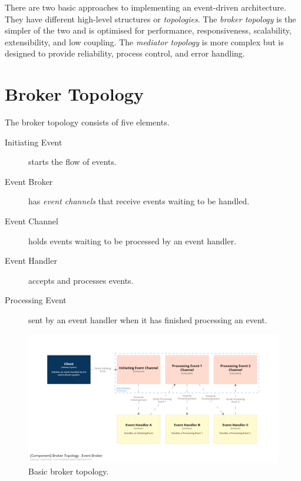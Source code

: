 There are two basic approaches to implementing an event-driven architecture.
They have different high-level structures or \emph{topologies}.
The \emph{broker topology} is the simpler of the two and is optimised for performance, responsiveness, scalability, extensibility, and low coupling.
The \emph{mediator topology} is more complex but is designed to provide reliability, process control, and error handling.


\section{Broker Topology}

The broker topology consists of five elements.

\begin{description}
    \item[Initiating Event] starts the flow of events.
    \item[Event Broker] has \emph{event channels} that receive events waiting to be handled.
    \item[Event Channel] holds events waiting to be processed by an event handler.
    \item[Event Handler] accepts and processes events.
    \item[Processing Event] sent by an event handler when it has finished processing an event.
\end{description}

\begin{figure}[h!]
    \begin{adjustwidth}{-10mm}{-10mm}
        \centering
        \includegraphics[trim=195 195 195 195,clip,width=0.97\paperwidth]{diagrams/broker-components.png}
    \end{adjustwidth}
    \caption{Basic broker topology.}
    \label{fig:broker-components}
\end{figure}

